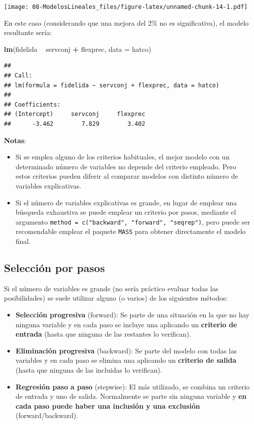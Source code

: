 \documentclass[]{book}
\newenvironment{Shaded}{\begin{snugshade}}{\end{snugshade}}
\newcommand{\DataTypeTok}[1]{\textcolor[rgb]{0.13,0.29,0.53}{#1}}
\newcommand{\KeywordTok}[1]{\textcolor[rgb]{0.13,0.29,0.53}{\textbf{#1}}}
\newcommand{\NormalTok}[1]{#1}
\newcommand{\OperatorTok}[1]{\textcolor[rgb]{0.81,0.36,0.00}{\textbf{#1}}}
\newcommand{\StringTok}[1]{\textcolor[rgb]{0.31,0.60,0.02}{#1}}
\begin{document}
\texttt{[image: 08-ModelosLineales\_files/figure-latex/unnamed-chunk-14-1.pdf]}

En este caso (considerando que una mejora del 2\% no es significativa), el modelo resultante sería:

\begin{Shaded}
\begin{Highlighting}[]
\KeywordTok{lm}\NormalTok{(fidelida }\OperatorTok{~}\StringTok{ }\NormalTok{servconj }\OperatorTok{+}\StringTok{ }\NormalTok{flexprec, }\DataTypeTok{data =}\NormalTok{ hatco)}
\end{Highlighting}
\end{Shaded}

\begin{verbatim}
## 
## Call:
## lm(formula = fidelida ~ servconj + flexprec, data = hatco)
## 
## Coefficients:
## (Intercept)     servconj     flexprec  
##      -3.462        7.829        3.402
\end{verbatim}

\textbf{Notas}:

\begin{itemize}
\item
  Si se emplea alguno de los criterios habituales, el mejor modelo con un determinado
  número de variables no depende del criterio empleado.
  Pero estos criterios pueden diferir al comparar modelos con distinto número de
  variables explicativas.
\item
  Si el número de variables explicativas es grande, en lugar de emplear una
  búsqueda exhaustiva se puede emplear un criterio por pasos, mediante el argumento
  \texttt{method\ =\ c("backward",\ "forward",\ "seqrep")}, pero puede ser recomendable
  emplear el paquete \texttt{MASS} para obtener directamente el modelo final.
\end{itemize}

\hypertarget{seleccion-por-pasos}{%
\subsection{Selección por pasos}\label{seleccion-por-pasos}}

Si el número de variables es grande (no sería práctico evaluar todas las posibilidades)
se suele utilizar alguno (o varios) de los siguientes métodos:

\begin{itemize}
\item
  \textbf{Selección progresiva} (forward): Se parte de una situación en la
  que no hay ninguna variable y en cada paso se incluye una aplicando
  un \textbf{criterio de entrada} (hasta que ninguna de las restantes lo
  verifican).
\item
  \textbf{Eliminación progresiva} (backward): Se parte del modelo con todas
  las variables y en cada paso se elimina una aplicando un \textbf{criterio
  de salida} (hasta que ninguna de las incluidas lo verifican).
\item
  \textbf{Regresión paso a paso} (stepwise): El más utilizado, se combina
  un criterio de entrada y uno de salida. Normalmente se parte sin
  ninguna variable y \textbf{en cada paso puede haber una inclusión y una
  exclusión} (forward/backward).
\end{itemize}
\end{document}
